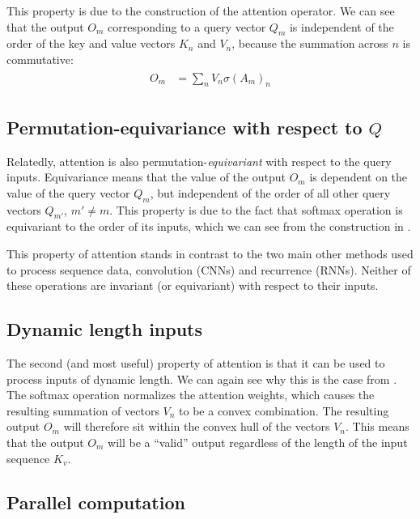 This property is due to the construction of the attention operator. We can see that the output $O_m$ corresponding to a query vector $Q_m$ is independent of the order of the key and value vectors $K_n$ and $V_n$, because the summation across $n$ is commutative:
\begin{align}
\label{eqn:attn-perm-invariance}
\begin{aligned}
    O_m &= \sum_n V_n \sigma(A_{m})_n
\end{aligned}
\end{align}

\subsection{Permutation-equivariance with respect to $Q$}

Relatedly, attention is also permutation-\textit{equivariant} with respect to the query inputs. Equivariance means that the value of the output $O_m$ is dependent on the value of the query vector $Q_m$, but independent of the order of all other query vectors $Q_{m'}$, $m' ≠ m$.
This property is due to the fact that softmax operation is equivariant to the order of its inputs, which we can see from the construction in .

This property of attention stands in contrast to the two main other methods used to process sequence data, convolution (CNNs) and recurrence (RNNs). Neither of these operations are invariant (or equivariant) with respect to their inputs.

\subsection{Dynamic length inputs}

The second (and most useful) property of attention is that it can be used to process inputs of dynamic length. We can again see why this is the case from . The softmax operation normalizes the attention weights, which causes the resulting summation of vectors $V_n$ to be a convex combination. The resulting output $O_m$ will therefore sit within the convex hull of the vectors $V_n$. This means that the output $O_m$ will be a ``valid'' output regardless of the length of the input sequence $K_v$.

\subsection{Parallel computation}

